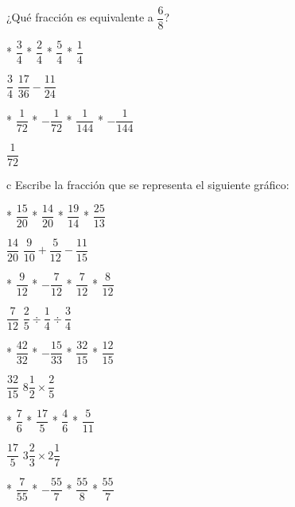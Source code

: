 ¿Qué fracción es equivalente a $\dfrac68$?
\begin{task}
  * $\dfrac34$
  * $\dfrac24$
  * $\dfrac54$
  * $\dfrac14$
\end{task}
$\dfrac34$
$\dfrac{17}{36}-\dfrac{11}{24}$
\begin{enum}
  * $\dfrac{1}{72}$
  * $-\dfrac{1}{72}$
  * $\dfrac{1}{144}$
  * $-\dfrac{1}{144}$
\end{enum}
$\dfrac{1}{72}$
\begin{tabular}{c}
  Escribe la fracción que se representa el siguiente gráfico:\vspace{5pt} \\
  \begin{tikzpicture}[fill=blue!20,draw=blue!60,thick]
    \matrix[%
      matrix of nodes,%
      nodes={draw,minimum size=1cm},%
      nodes in empty cells,%
      column sep=-\pgflinewidth,%
      row sep=-\pgflinewidth%
    ]{%
      |[fill]| & |[fill]| &          & |[fill]| & |[fill]| \\
               & |[fill]| & |[fill]| & |[fill]| &          \\
               & |[fill]| & |[fill]| & |[fill]| &          \\
      |[fill]| & |[fill]| &          & |[fill]| & |[fill]| \\
    };
  \end{tikzpicture}
\end{tabular}
\begin{task}
  * $\dfrac{15}{20}$
  * $\dfrac{14}{20}$
  * $\dfrac{19}{14}$
  * $\dfrac{25}{13}$
\end{task}
$\dfrac{14}{20}$
$\dfrac{9}{10}+\dfrac{5}{12}-\dfrac{11}{15}$
\begin{enum}
  * $\dfrac{9}{12}$
  * $-\dfrac{7}{12}$
  * $\dfrac{7}{12}$
  * $\dfrac{8}{12}$
\end{enum}
$\dfrac{7}{12}$
$\dfrac25\div\dfrac14\div\dfrac34$
\begin{enum}
  * $\dfrac{42}{32}$
  * $-\dfrac{15}{33}$
  * $\dfrac{32}{15}$
  * $\dfrac{12}{15}$
\end{enum}
$\dfrac{32}{15}$
$8\dfrac12\times\dfrac25$
\begin{enum}
  * $\dfrac76$
  * $\dfrac{17}{5}$
  * $\dfrac46$
  * $\dfrac{5}{11}$
\end{enum}
$\dfrac{17}{5}$
$3\dfrac23\times 2\dfrac17$
\begin{enum}
  * $\dfrac{7}{55}$
  * $-\dfrac{55}{7}$
  * $\dfrac{55}{8}$
  * $\dfrac{55}{7}$
\end{enum}
